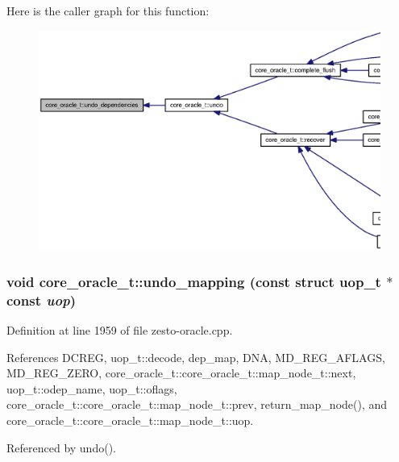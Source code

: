 Here is the caller graph for this function:\nopagebreak
\begin{figure}[H]
\begin{center}
\leavevmode
\includegraphics[width=420pt]{classcore__oracle__t_56379122fc2f63fc767cdf82e346b98b_icgraph}
\end{center}
\end{figure}
\subsubsection[{undo\_\-mapping}]{\setlength{\rightskip}{0pt plus 5cm}void core\_\-oracle\_\-t::undo\_\-mapping (const struct {\bf uop\_\-t} $\ast$const  {\em uop})\hspace{0.3cm}{\tt  [protected]}}\label{classcore__oracle__t_dc47fe294aeba52e39f9a11276522823}




Definition at line 1959 of file zesto-oracle.cpp.

References DCREG, uop\_\-t::decode, dep\_\-map, DNA, MD\_\-REG\_\-AFLAGS, MD\_\-REG\_\-ZERO, core\_\-oracle\_\-t::core\_\-oracle\_\-t::map\_\-node\_\-t::next, uop\_\-t::odep\_\-name, uop\_\-t::oflags, core\_\-oracle\_\-t::core\_\-oracle\_\-t::map\_\-node\_\-t::prev, return\_\-map\_\-node(), and core\_\-oracle\_\-t::core\_\-oracle\_\-t::map\_\-node\_\-t::uop.

Referenced by undo().

